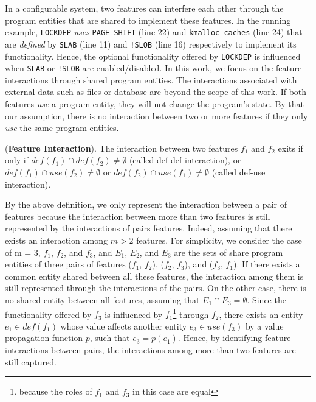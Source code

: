 In a configurable system, two features can interfere each other 
through the program entities that are shared to implement these 
features. In the running example, \texttt{LOCKDEP} \textit{uses} 
\texttt{PAGE\_SHIFT} (line 22) and \texttt{kmalloc\_caches} (line 24) 
that are \textit{defined} by \texttt{SLAB} (line 11) and 
\texttt{!SLOB} (line 16) respectively to implement its functionality.
Hence, the optional functionality offered by \texttt{LOCKDEP} is
influenced when \texttt{SLAB} or \texttt{!SLOB} are enabled/disabled.
%
%
In this work, we focus on the feature interactions through shared 
program entities. The interactions associated with external data such 
as files or database are beyond the scope of this work. If both 
features \textit{use} a program entity, they will not change the 
program's state. By that our assumption, there is no interaction 
between two or more features if they only \textit{use} the same 
program entities. 

%
\begin{Definition}{({\bf Feature Interaction}).}
The interaction between two features $f_1$ and $f_2$ exits if only if 
$def(f_1) \cap def(f_2) \neq \emptyset$ (called def-def interaction), or $def(f_1) \cap use(f_2) \neq \emptyset$ or $def(f_2) \cap use(f_1) \neq \emptyset$ (called def-use interaction).
\end{Definition}
%

By the above definition, we only represent the interaction between a 
pair of features because the interaction between more than two 
features is still represented by the interactions of pairs features. 
Indeed, assuming that there exists an interaction among $m > 2$ 
features. For simplicity, we consider the case of m = 3, $f_1$, 
$f_2$, and $f_3$, and $E_1$, $E_2$, and $E_3$ are the sets of share 
program entities of three pairs of features ($f_1$, $f_2$), ($f_2$, $f_3$), and ($f_3$, $f_1$).
%
If there exists a common entity shared between all these features, 
the interaction among them is still represented through the interactions 
of the pairs.
%
On the other case, there is no shared entity between all features, 
assuming that $E_1 \cap E_3 = \emptyset$. Since the functionality 
offered by $f_3$ is influenced by $f_1$\footnote{because the roles of 
$f_1$ and $f_3$ in this case are equal} through $f_2$, there exists 
an entity $e_1 \in def(f_1)$ whose value affects another entity $e_3 
\in use(f_3)$ by a value propagation function $p$, such that $e_3 = 
p(e_1)$. Hence, by identifying feature interactions between pairs, 
the interactions among more than two features are still captured. 
%

